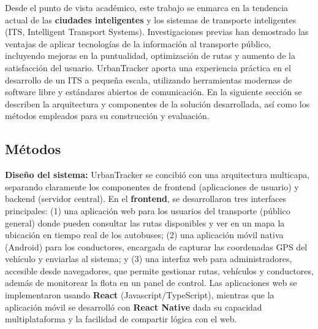 \documentclass[
]{article}
\begin{document}
Desde el punto de vista académico, este trabajo se enmarca en la
tendencia actual de las \textbf{ciudades inteligentes} y los sistemas de
transporte inteligentes (ITS, Intelligent Transport Systems).
Investigaciones previas han demostrado las ventajas de aplicar
tecnologías de la información al transporte público, incluyendo mejoras
en la puntualidad, optimización de rutas y aumento de la satisfacción
del usuario. UrbanTracker aporta una experiencia práctica en el
desarrollo de un ITS a pequeña escala, utilizando herramientas modernas
de software libre y estándares abiertos de comunicación. En la siguiente
sección se describen la arquitectura y componentes de la solución
desarrollada, así como los métodos empleados para su construcción y
evaluación.

\subsection{Métodos}\label{muxe9todos}

\textbf{Diseño del sistema:} UrbanTracker se concibió con una
arquitectura multicapa, separando claramente los componentes de frontend
(aplicaciones de usuario) y backend (servidor central). En el
\textbf{frontend}, se desarrollaron tres interfaces principales: (1) una
aplicación web para los usuarios del transporte (público general) donde
pueden consultar las rutas disponibles y ver en un mapa la ubicación en
tiempo real de los autobuses; (2) una aplicación móvil nativa (Android)
para los conductores, encargada de capturar las coordenadas GPS del
vehículo y enviarlas al sistema; y (3) una interfaz web para
administradores, accesible desde navegadores, que permite gestionar
rutas, vehículos y conductores, además de monitorear la flota en un
panel de control. Las aplicaciones web se implementaron usando
\textbf{React} (Javascript/TypeScript), mientras que la aplicación móvil
se desarrolló con \textbf{React Native} dada su capacidad
multiplataforma y la facilidad de compartir lógica con el web.
\end{document}
